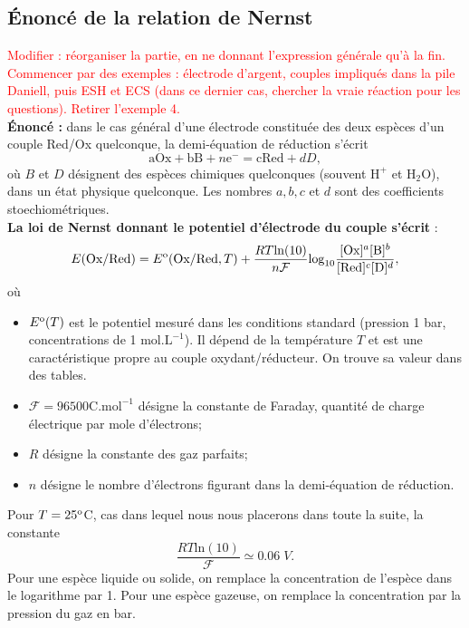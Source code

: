 \documentclass[11pt,a4paper]{report}
\begin{document}
\subsection{Énoncé de la relation de Nernst}

\textcolor{red}{Modifier : réorganiser la partie, en ne donnant l'expression générale qu'à la fin. Commencer par des exemples : électrode d'argent, couples impliqués dans la pile Daniell,
puis ESH et ECS (dans ce dernier cas, chercher la vraie réaction pour les questions). Retirer l'exemple 4.}\\

\textbf{\'Enoncé :} dans le cas général d'une électrode constituée des deux espèces d'un couple Red/Ox quelconque, la demi-équation de réduction s'écrit 
\begin{equation}
	\text{a} \text{Ox} + \text{b} \text{B} + n \text{e}^- = \text{c} \text{Red} + d D,
\end{equation}
où $B$ et $D$ désignent des espèces chimiques quelconques (souvent $\text{H}^\text{+}$ et $\text{H}_2\text{O}$), dans un état physique quelconque. Les nombres $a,b,c$ et $d$ sont des coefficients stoechiométriques.\\

\textbf{La loi de Nernst donnant le potentiel d'électrode du couple s'écrit} :
\begin{equation}
	E(\text{Ox}/\text{Red}) = E\textsuperscript{o}(\text{Ox}/\text{Red},T) + \frac{RT\text{ln}(10)}{n\mathcal{F}}\text{log}_{10} \frac{[\text{Ox}]^a[\text{B}]^b}{[\text{Red}]^c[\text{D}]^d},
\end{equation}
où
\begin{itemize}
	\item $E\textsuperscript{o}(T)$ est le potentiel mesuré dans les conditions standard (pression 1 bar, concentrations de 1 $\text{mol.L}^{-1}$). Il dépend de la température $T$ et est une caractéristique propre au couple oxydant/réducteur. On trouve sa valeur dans des tables.
	\item $\mathcal{F} = 96500 \text{C.mol}^{-1}$ désigne la constante de Faraday, quantité de charge électrique par mole d'électrons;
	\item $R$ désigne la constante des gaz parfaits;
	\item $n$ désigne le nombre d'électrons figurant dans la demi-équation de réduction.\\ 
\end{itemize}

Pour $T = 25\textsuperscript{o}$C, cas dans lequel nous nous placerons dans toute la suite, la constante
\begin{equation}
	\frac{RT\text{ln}(10)}{\mathcal{F}} \simeq 0.06\;V.
\end{equation}
Pour une espèce liquide ou solide, on remplace la concentration de l'espèce dans le logarithme par 1. Pour une espèce gazeuse, on remplace la concentration par la pression du gaz en bar.\\
\end{document}
